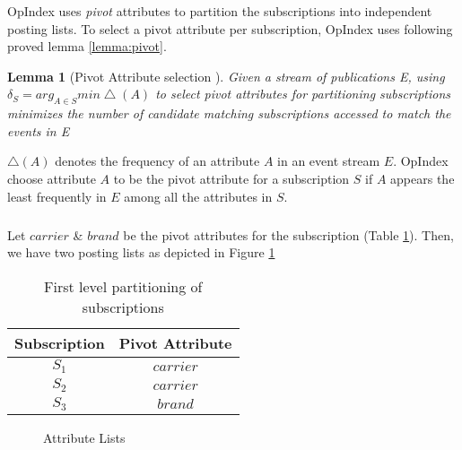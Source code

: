 \documentclass[a4paper,12pt,oneside]{book}
\newtheorem{lemma}[theorem]{Lemma}
\theoremstyle{definition}
\theoremstyle{remark}
\begin{document}
OpIndex uses \emph{pivot} attributes to partition the subscriptions into independent posting lists. To select a pivot attribute per subscription, OpIndex uses following proved lemma \ref{lemma:pivot}.   

\begin{lemma}[Pivot Attribute selection \label{lemma:pivot}]
Given a stream of publications E, using $\delta_S=arg_{A\in S}min \bigtriangleup(A)$ to select pivot attributes for partitioning subscriptions minimizes the number of candidate matching subscriptions accessed to match the events in E
\end{lemma}

$\bigtriangleup(A)$ denotes the frequency of an attribute $A$ in an event stream $E$. OpIndex choose attribute $A$ to be the pivot attribute for a subscription $S$ if $A$ appears the least frequently in $E$ among all the attributes in $S$.

\subparagraph*{}
Let $carrier$ \& $brand$ be the pivot attributes for the subscription (Table \ref{ta:subl1}). Then, we have two posting lists as depicted in Figure \ref{img:l1part}


\begin{table}[ht]
\caption{First level partitioning of subscriptions} %
\centering %
\begin{tabular}{c c} %
\hline
Subscription & Pivot Attribute \\ [0.5ex] %
\hline %
$S_1$ & $carrier$ \\ %
$S_2$ & $carrier$ \\
$S_3$ & $brand$ \\ [1ex] %
\hline %
\end{tabular}
\label{ta:subl1}
\end{table}

\begin{figure}
\caption{Attribute Lists}
\centering
{}
\label{img:l1part}
\end{figure}
\end{document}
